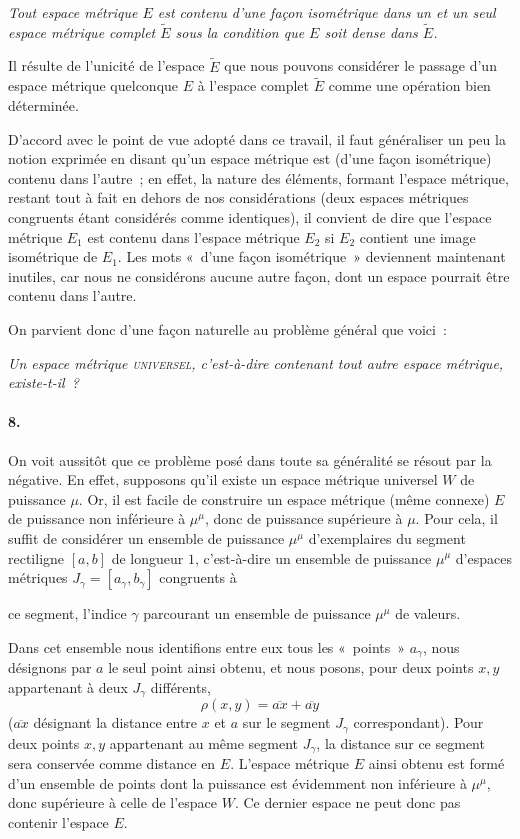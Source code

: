 \documentclass[a4paper,12pt]{amsart}
\newcommand{\srcpage}[1]{} %
\begin{document}
\textit{Tout espace métrique $E$ est contenu d'une façon isométrique dans un et un seul espace métrique complet $\widetilde{E}$ sous la condition que $E$ soit dense dans $\widetilde{E}$.}

Il résulte de l'unicité de l'espace $\widetilde{E}$ que nous pouvons considérer le passage d'un espace métrique quelconque $E$ à l'espace complet $\widetilde{E}$ comme une opération bien déterminée.

D'accord avec le point de vue adopté dans ce travail, il faut généraliser un peu la notion exprimée en disant qu'un espace métrique est (d'une façon isométrique) contenu dans l'autre~; en effet, la nature des éléments, formant l'espace métrique, restant tout à fait en dehors de nos considérations (deux espaces métriques congruents étant considérés comme identiques), il convient de dire que l'espace métrique $E_1$ est contenu dans l'espace métrique $E_2$ si $E_2$ contient une image isométrique de $E_1$. Les mots «~d'une façon isométrique~» deviennent maintenant inutiles, car nous ne considérons aucune autre façon, dont un espace pourrait être contenu dans l'autre.

On parvient donc d'une façon naturelle au problème général que voici~:

\textit{Un espace métrique \textup{\textsc{universel}}, c'est-à-dire contenant tout autre espace métrique, existe-t-il~?}

\paragraph{8.}
On voit aussitôt que ce problème posé dans toute sa généralité se résout par la négative. En effet, supposons qu'il existe un espace métrique universel $W$ de puissance $\mu$. Or, il est facile de construire un espace métrique (même connexe) $E$ de puissance non inférieure à $\mu^{\mu}$, donc de puissance supérieure à $\mu$. Pour cela, il suffit de considérer un ensemble de puissance $\mu^{\mu}$ d'exemplaires du segment rectiligne $[a,b]$ de longueur $1$, c'est-à-dire un ensemble de puissance $\mu^{\mu}$ d'espaces métriques $J_\gamma=[a_\gamma,b_\gamma]$ congruents à
\srcpage{51}
ce segment, l'indice $\gamma$ parcourant un ensemble de puissance $\mu^{\mu}$ de valeurs.

Dans cet ensemble nous identifions entre eux tous les «~points~» $a_\gamma$, nous désignons par $a$ le seul point ainsi obtenu, et nous posons, pour deux points $x,y$ appartenant à deux $J_\gamma$ différents,
\[
\rho(x,y)=\overline{ax}+\overline{ay}
\]
($\overline{ax}$ désignant la distance entre $x$ et $a$ sur le segment $J_\gamma$ correspondant). Pour deux points $x,y$ appartenant au même segment $J_\gamma$, la distance sur ce segment sera conservée comme distance en $E$. L'espace métrique $E$ ainsi obtenu est formé d'un ensemble de points dont la puissance est évidemment non inférieure à $\mu^{\mu}$, donc supérieure à celle de l'espace $W$. Ce dernier espace ne peut donc pas contenir l'espace $E$.
\end{document}
